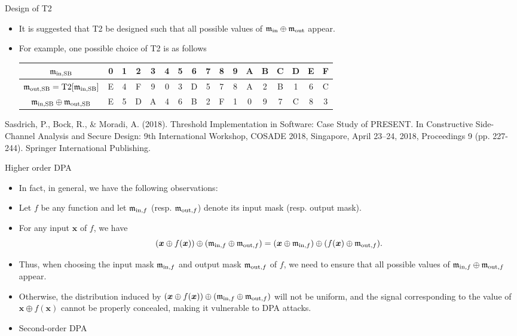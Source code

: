 \begin{frame}{Design of T2}
    \begin{itemize}
        \item It is suggested that T2 be designed such that all possible values of ${\mathfrak m}_{\text{in}}\oplus{\mathfrak m}_{\text{out}}$ appear.
        \item For example, one possible choice of T2 is as follows
\begin{table}[htb]
    \centering
    \ttfamily
    \begin{tabular}{c|cccccccccccccccc}\hline
    ${\mathfrak m}_{\textnormal{in,SB}}$  &  0 & 1 & 2 & 3 & 4 & 5 & 6 & 7 & 8 & 9 & A & B & C & D & E & F \\\hline
    ${\mathfrak m}_{\textnormal{out,SB}}=\textnormal{T2}[{\mathfrak m}_{\textnormal{in,SB}}]$    &  E & 4 & F & 9 & 0 & 3 & D & 5 & 7 & 8 & A & 2 & B & 1 & 6 & C\\\hline
    ${\mathfrak m}_{\textnormal{in,SB}}\oplus{\mathfrak m}_{\text{out,SB}}$ & E & 5 & D & A & 4 & 6 & B & 2 & F & 1 & 0 & 9 & 7 & C & 8 & 3\\\hline
    \end{tabular}
\end{table}
    \end{itemize}
    \vfill
    {\footnotesize Sasdrich, P., Bock, R., \& Moradi, A. (2018). Threshold Implementation in Software: Case Study of PRESENT. In Constructive Side-Channel Analysis and Secure Design: 9th International Workshop, COSADE 2018, Singapore, April 23–24, 2018, Proceedings 9 (pp. 227-244). Springer International Publishing.}
\end{frame}

\begin{frame}{Higher order DPA}
    \begin{itemize}
        \item In fact, in general, we have the following observations:
        \item Let $f$ be any function and let ${\mathfrak m}_{\text{in},f}$ (resp. ${\mathfrak m}_{\text{out},f}$) denote its input mask (resp. output mask).
       \item For any input $\boldsymbol{x}$ of $f$, we have
    \[
   (\boldsymbol{x} \oplus f(\boldsymbol{x}))\oplus({\mathfrak m}_{\text{in},f}\oplus{\mathfrak m}_{\text{out},f})=(\boldsymbol{x}\oplus{\mathfrak m}_{\text{in},f})\oplus(f(\boldsymbol{x})\oplus{\mathfrak m}_{\text{out},f}).
    \]
     \item Thus, when choosing the input mask ${\mathfrak m}_{\text{in},f}$ and output mask ${\mathfrak m}_{\text{out},f}$ of $f$, we need to ensure that all possible values of ${\mathfrak m}_{\text{in},f}\oplus{\mathfrak m}_{\text{out},f}$ appear.
     \item Otherwise, the distribution induced by $(\boldsymbol{x} \oplus f(\boldsymbol{x}))\oplus({\mathfrak m}_{\text{in},f}\oplus{\mathfrak m}_{\text{out},f})$ will not be uniform, and the signal corresponding to the value of $\boldsymbol{x}\oplus f(\boldsymbol{x})$ cannot be properly concealed, making it vulnerable to DPA attacks.
     \item Second-order DPA
    \end{itemize}
\end{frame}

